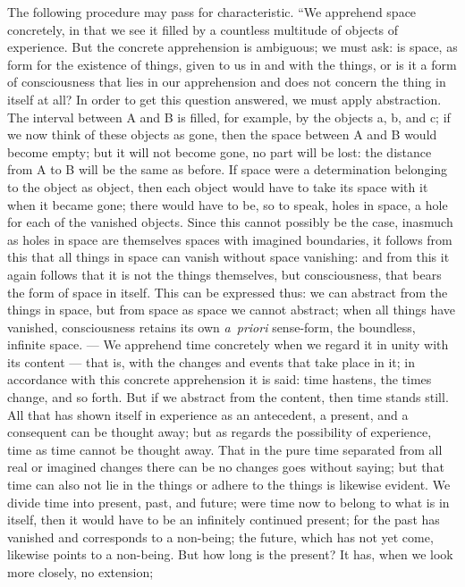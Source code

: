 \documentclass[12pt]{book}
\begin{document}
The following procedure may pass for characteristic. ``We apprehend space
concretely, in that we see it filled by a countless multitude of objects of
experience. But the concrete apprehension is ambiguous; we must ask: is space,
as form for the existence of things, given to us in and with the things, or is
it a form of consciousness that lies in our apprehension and does not concern
the thing in itself at all? In order to get this question answered, we must
apply abstraction. The interval between A and B is filled, for example, by the
objects a, b, and c; if we now think of these objects as gone, then the space
between A and B would become empty; but it will not become gone, no part will
be lost: the distance from A to B will be the same as before. If space were a
determination belonging to the object as object, then each object would have
to take its space with it when it became gone; there would have to be, so to
speak, holes in space, a hole for each of the vanished objects. Since this
cannot possibly be the case, inasmuch as holes in space are themselves spaces
with imagined boundaries, it follows from this that all things in space can
vanish without space vanishing: and from this it again follows that it is not
the things themselves, but consciousness, that bears the form of space in
itself. This can be expressed thus: we can abstract from the things in space,
but from space as space we cannot abstract; when all things have vanished,
consciousness retains its own \textit{a~priori} sense-form, the boundless,
infinite space. --- We apprehend time concretely when we regard it in unity
with its content --- that is, with the changes and events that take place in
it; in accordance with this concrete apprehension it is said: time hastens,
the times change, and so forth. But if we abstract from the content, then time
stands still. All that has shown itself in experience as an antecedent, a
present, and a consequent can be thought away; but as regards the possibility
of experience, time as time cannot be thought away. That in the pure time
separated from all real or imagined changes there can be no changes goes
without saying; but that time can also not lie in the things or adhere to the
things is likewise evident. We divide time into present, past, and future;
were time now to belong to what is in itself, then it would have to be an
infinitely continued present; for the past has vanished and corresponds to a
non-being; the future, which has not yet come, likewise points to a non-being.
But how long is the present? It has, when we look more closely, no extension;
\end{document}
